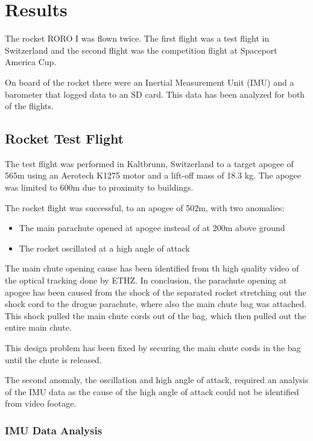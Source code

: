 \section{Results}

The rocket RORO I was flown twice. The first flight was a test flight in Switzerland and the second flight was the competition flight at Spaceport America Cup.

On board of the rocket there were an Inertial Measurement Unit (IMU) and a barometer that logged data to an SD card.
This data has been analyzed for both of the flights.

\subsection{Rocket Test Flight}

The test flight was performed in Kaltbrunn, Switzerland to a target apogee of 565m using an Aerotech K1275 motor and a lift-off mass of 18.3 kg. The apogee was limited to 600m due to proximity to buildings.

The rocket flight was successful, to an apogee of 502m, with two anomalies:
\begin{itemize}
    \item The main parachute opened at apogee instead of at 200m above ground
    \item The rocket oscillated at a high angle of attack
\end{itemize}

The main chute opening cause has been identified from th high quality video of the optical tracking done by ETHZ.
In conclusion, the parachute opening at apogee has been caused from the shock of the separated rocket stretching out the shock cord to the drogue parachute, where also the main chute bag was attached.
This shock pulled the main chute cords out of the bag, which then pulled out the entire main chute.

This design problem has been fixed by securing the main chute cords in the bag until the chute is released.

The second anomaly, the oscillation and high angle of attack, required an analysis of the IMU data as the cause of the high angle of attack could not be identified from video footage.

\subsubsection{IMU Data Analysis}

